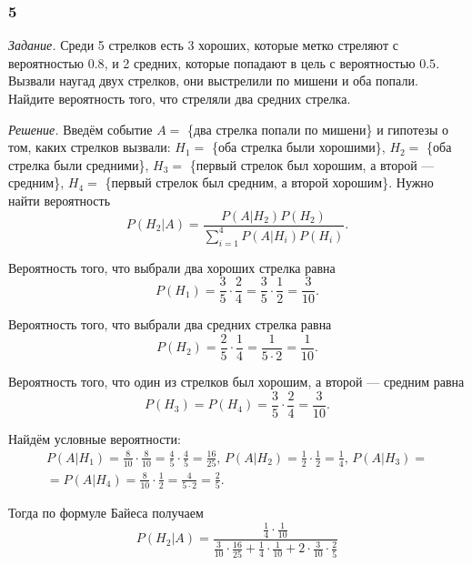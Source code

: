 \subsubsection*{5}

\textit{Задание.}
Среди 5 стрелков есть 3 хороших, которые метко стреляют с вероятностью $0.8$, и 2 средних, которые попадают в цель с вероятностью $0.5$.
Вызвали наугад двух стрелков, они выстрелили по мишени и оба попали.
Найдите вероятность того, что стреляли два средних стрелка.

\textit{Решение.}
Введём событие $A =$ \{два стрелка попали по мишени\} и гипотезы о том,
каких стрелков вызвали: $H_1 =$ \{оба стрелка были хорошими\},
$H_2 =$ \{оба стрелка были средними\}, $H_3 =$ \{первый стрелок был хорошим, а второй --- средним\}, $H_4 =$ \{первый стрелок был средним, а второй хорошим\}.
Нужно найти вероятность
$$P \left( \left. H_2 \right| A \right) =
\frac{P \left( \left. A \right| H_2 \right) P \left( H_2 \right) }{ \sum \limits_{i=1}^4 P \left( \left. A \right| H_i \right) P \left( H_i \right) }.$$

Вероятность того, что выбрали два хороших стрелка равна
$$P \left( H_1 \right) =
\frac{3}{5} \cdot \frac{2}{4} =
\frac{3}{5} \cdot \frac{1}{2} =
\frac{3}{10}.$$

Вероятность того, что выбрали два средних стрелка равна
$$P \left( H_2 \right) =
\frac{2}{5} \cdot \frac{1}{4} =
\frac{1}{5 \cdot 2} =
\frac{1}{10}.$$

Вероятность того, что один из стрелков был хорошим, а второй --- средним равна
$$P \left( H_3 \right) =
P \left( H_4 \right) =
\frac{3}{5} \cdot \frac{2}{4} =
\frac{3}{10}.$$

Найдём условные вероятности:
\begin{equation*}
\begin{split}
P \left( \left. A \right| H_1 \right) =
\frac{8}{10} \cdot \frac{8}{10} =
\frac{4}{5} \cdot \frac{4}{5} =
\frac{16}{25}, \,
P \left( \left. A \right| H_2 \right) =
\frac{1}{2} \cdot \frac{1}{2} =
\frac{1}{4}, \,
P \left( \left. A \right| H_3 \right) = \\
= P \left( \left. A \right| H_4 \right) =
\frac{8}{10} \cdot \frac{1}{2} =
\frac{4}{5 \cdot 2} =
\frac{2}{5}.
\end{split}
\end{equation*}

Тогда по формуле Байеса получаем
$$P \left( \left. H_2 \right| A \right) =
\frac{ \frac{1}{4} \cdot \frac{1}{10} }{ \frac{3}{10} \cdot \frac{16}{25} + \frac{1}{4} \cdot \frac{1}{10} + 2 \cdot \frac{3}{10} \cdot \frac{2}{5} }$$
